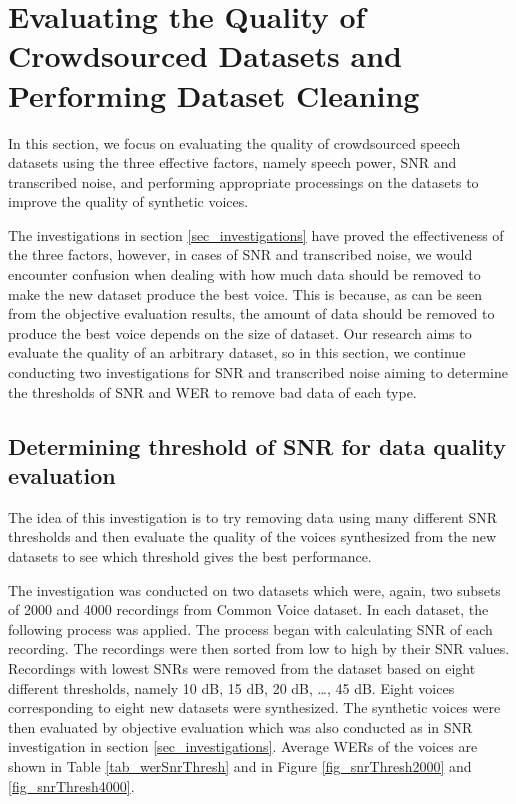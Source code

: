 \documentclass[12pt]{article}
\begin{document}

\clearpage
\section{Evaluating the Quality of Crowdsourced Datasets and Performing Dataset Cleaning}\label{sec_evaluateAndDataCleaning}
In this section, we focus on evaluating the quality of crowdsourced speech datasets using the three effective factors, namely speech power, SNR and transcribed noise, and performing appropriate processings on the datasets to improve the quality of synthetic voices.

The investigations in section \ref{sec_investigations} have proved the effectiveness of the three factors, however, in cases of SNR and transcribed noise, we would encounter confusion when dealing with how much data should be removed to make the new dataset produce the best voice. This is because, as can be seen from the objective evaluation results, the amount of data should be removed to produce the best voice depends on the size of dataset. Our research aims to evaluate the quality of an arbitrary dataset, so in this section, we continue conducting two investigations for SNR and transcribed noise aiming to determine the thresholds of SNR and WER to remove bad data of each type.

\subsection{Determining threshold of SNR for data quality evaluation}
The idea of this investigation is to try removing data using many different SNR thresholds and then evaluate the quality of the voices synthesized from the new datasets to see which threshold gives the best performance.

The investigation was conducted on two datasets which were, again, two subsets of 2000 and 4000 recordings from Common Voice dataset. In each dataset, the following process was applied. The process began with calculating SNR of each recording. The recordings were then sorted from low to high by their SNR values. Recordings with lowest SNRs were removed from the dataset based on eight different thresholds, namely 10 dB, 15 dB, 20 dB, …, 45 dB. Eight voices corresponding to eight new datasets were synthesized. The synthetic voices were then evaluated by objective evaluation which was also conducted as in SNR investigation in section \ref{sec_investigations}. Average WERs of the voices are shown in Table \ref{tab_werSnrThresh} and in Figure \ref{fig_snrThresh2000} and \ref{fig_snrThresh4000}.
\end{document}
